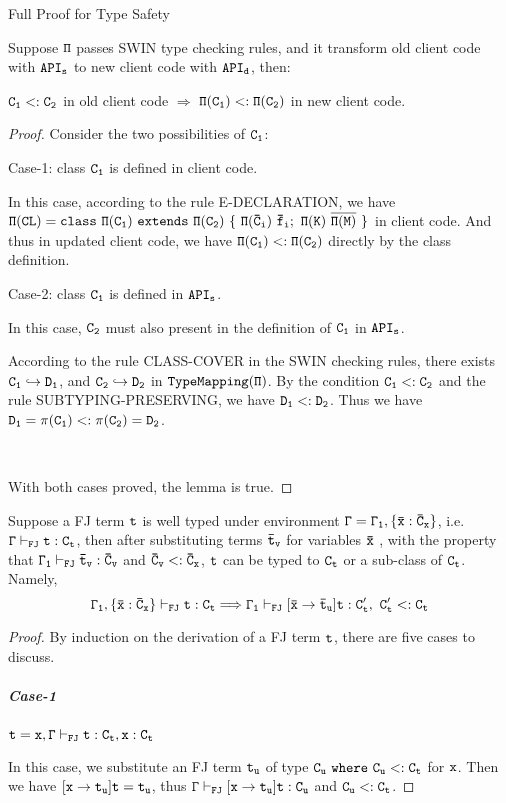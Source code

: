 \begin{section}{Full Proof for Type Safety}
\begin{lemma}
Suppose $\tt \Pi$ passes SWIN type checking rules, and it transform old client code with $\tt API_s$ to new client code with $\tt API_d$, then:\par
$\tt C_1<: C_2 $ in old client code $\Rightarrow$ $\tt\Pi(C_1)<:\Pi(C_2)$ in new client code.
\end{lemma}
\begin{proof} Consider the two possibilities of $\tt C_1$:
\begin{subparagraph}{Case-1:} class $\tt C_1$ is defined in client code. 
\par
In this case, according to the rule E-DECLARATION, we have $\tt \Pi(CL)= class\ \Pi(C_1)\ extends\ \Pi(C_2)\ \{\ \Pi(\bar{C}_i)\ \bar{f}_i;\ \Pi(K)\  \overline{\Pi(M)}\ \}$ in client code. And thus in updated client code, we have $\tt\Pi(C_1) <: \Pi(C_2)$ directly by the class definition.
\end{subparagraph}
\begin{subparagraph}{Case-2:} class $\tt C_1$ is defined in $\tt API_s$.
\par
In this case, $\tt C_2$ must also present in the definition of $\tt C_1$ in $\tt API_s$. 
\par
According to the rule CLASS-COVER in the SWIN checking rules, there exists $\tt C_1\hookrightarrow D_1$, and $\tt C_2\hookrightarrow D_2$ in $\tt TypeMapping(\Pi)$.
By the condition $\tt C_1<:C_2$ and the rule SUBTYPING-PRESERVING, we have $\tt D_1 <: D_2$. Thus we have $\tt D_1=\pi(C_1) <: \pi(C_2)=D_2$.
\end{subparagraph}
\par \ 
\par
With both cases proved, the lemma is true.
\end{proof}

\begin{lemma}
Suppose a FJ term $\tt t$ is well typed under environment $\tt \Gamma=\Gamma_1,\{\bar{x}:\bar{C}_x\}$, i.e. $\tt \Gamma\vdash_{FJ} t:C_t$, then after substituting terms $\tt \bar{t}_v$ for variables $\tt \bar{x}$ , with the property that $\tt\Gamma_1\vdash_{FJ}\bar{t}_v:\bar{C}_v$ and $\tt\bar{C}_v <: \bar{C}_x$, $\tt t$ can be typed to $\tt C_t$ or a sub-class of $\tt C_t$. Namely,
$$\tt \Gamma_1,\{\bar{x}:\bar{C}_x\} \vdash_{FJ} t:C_t \Longrightarrow \Gamma_1\vdash_{FJ} [\bar{x}\rightarrow\bar{t}_u]t: C'_t,\ C'_t <: C_t$$
\end{lemma}
\begin{proof}
By induction on the derivation of a FJ term $\tt t$, there are five cases to discuss.
\subparagraph{Case-1}$\tt t=x, \Gamma\vdash_{FJ} t:C_t, x:C_t$
\par
In this case, we substitute an FJ term $\tt t_u$ of type $\tt C_u\ where\ \tt C_u<:C_t$ for $\tt x$. Then we have $\tt[x\rightarrow t_u]t=t_u$, thus $\tt\Gamma\vdash_{FJ} [x\rightarrow t_u]t:C_u$ and $\tt C_u<:C_t$.


\end{proof}
\end{section}
